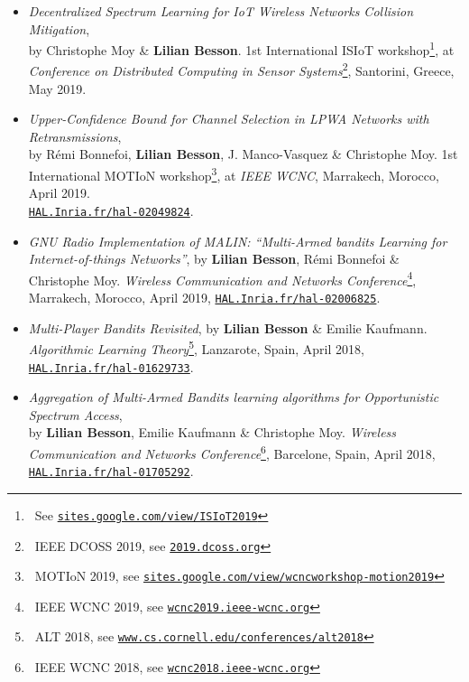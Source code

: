 \begin{itemize}

\item
    \emph{Decentralized Spectrum Learning for IoT Wireless Networks Collision Mitigation},\\
    by Christophe Moy \& \textbf{Lilian Besson}.
    1st International ISIoT workshop\footnote{~See \href{https://sites.google.com/view/ISIoT2019}{\texttt{sites.google.com/view/ISIoT2019}}},
    at \emph{Conference on Distributed Computing in Sensor Systems}\footnote{~IEEE DCOSS 2019, see \href{http://2019.dcoss.org}{\texttt{2019.dcoss.org}}}, Santorini, Greece, May 2019.
    \cite{MoyBesson2019}

\item
    \emph{Upper-Confidence Bound for Channel Selection in LPWA Networks with Retransmissions},\\
    by Rémi Bonnefoi, \textbf{Lilian Besson}, J. Manco-Vasquez \& Christophe Moy.
    1st International MOTIoN workshop\footnote{~MOTIoN 2019, see \href{https://sites.google.com/view/wcncworkshop-motion2019}{\texttt{sites.google.com/view/wcncworkshop-motion2019}}},
    at \emph{IEEE WCNC}, Marrakech, Morocco, April 2019.\\
    \href{https://HAL.Inria.fr/hal-02049824}{\texttt{HAL.Inria.fr/hal-02049824}}.
    \cite{Bonnefoi2019WCNC}

\item
    \emph{GNU Radio Implementation of MALIN: ``Multi-Armed bandits Learning for Internet-of-things Networks''},
    by \textbf{Lilian Besson}, Rémi Bonnefoi \& Christophe Moy.
    \emph{Wireless Communication and Networks Conference}\footnote{~IEEE WCNC 2019, see \href{http://wcnc2019.ieee-wcnc.org}{\texttt{wcnc2019.ieee-wcnc.org}}}, Marrakech, Morocco, April 2019,
    \href{https://HAL.Inria.fr/hal-02006825}{\texttt{HAL.Inria.fr/hal-02006825}}.
    \cite{Besson2019WCNC}

\item
    \emph{Multi-Player Bandits Revisited},
    by \textbf{Lilian Besson} \& Emilie Kaufmann.
    \emph{Algorithmic Learning Theory}\footnote{~ALT 2018, see \href{http://www.cs.cornell.edu/conferences/alt2018}{\texttt{www.cs.cornell.edu/conferences/alt2018}}}, Lanzarote, Spain, April 2018,
    \href{https://HAL.Inria.fr/hal-01629733}{\texttt{HAL.Inria.fr/hal-01629733}}.
    \cite{Besson2018ALT}

\item
    \emph{Aggregation of Multi-Armed Bandits learning algorithms for Opportunistic Spectrum Access},\\
    by \textbf{Lilian Besson}, Emilie Kaufmann \& Christophe Moy.
    \emph{Wireless Communication and Networks Conference}\footnote{~IEEE WCNC 2018, see \href{http://wcnc2018.ieee-wcnc.org}{\texttt{wcnc2018.ieee-wcnc.org}}}, Barcelone, Spain, April 2018,
    \href{https://HAL.Inria.fr/hal-01705292}{\texttt{HAL.Inria.fr/hal-01705292}}.
    \cite{Besson2018WCNC}


\end{itemize}
